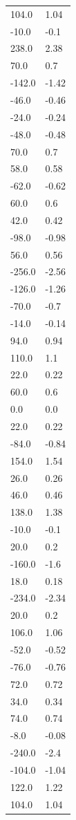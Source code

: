 \begin{longtable}{ll}
104.0 & 1.04 \\
-10.0 & -0.1 \\
238.0 & 2.38 \\
70.0 & 0.7 \\
-142.0 & -1.42 \\
-46.0 & -0.46 \\
-24.0 & -0.24 \\
-48.0 & -0.48 \\
70.0 & 0.7 \\
58.0 & 0.58 \\
-62.0 & -0.62 \\
60.0 & 0.6 \\
42.0 & 0.42 \\
-98.0 & -0.98 \\
56.0 & 0.56 \\
-256.0 & -2.56 \\
-126.0 & -1.26 \\
-70.0 & -0.7 \\
-14.0 & -0.14 \\
94.0 & 0.94 \\
110.0 & 1.1 \\
22.0 & 0.22 \\
60.0 & 0.6 \\
0.0 & 0.0 \\
22.0 & 0.22 \\
-84.0 & -0.84 \\
154.0 & 1.54 \\
26.0 & 0.26 \\
46.0 & 0.46 \\
138.0 & 1.38 \\
-10.0 & -0.1 \\
20.0 & 0.2 \\
-160.0 & -1.6 \\
18.0 & 0.18 \\
-234.0 & -2.34 \\
20.0 & 0.2 \\
106.0 & 1.06 \\
-52.0 & -0.52 \\
-76.0 & -0.76 \\
72.0 & 0.72 \\
34.0 & 0.34 \\
74.0 & 0.74 \\
-8.0 & -0.08 \\
-240.0 & -2.4 \\
-104.0 & -1.04 \\
122.0 & 1.22 \\
104.0 & 1.04 \\

\end{longtable}
